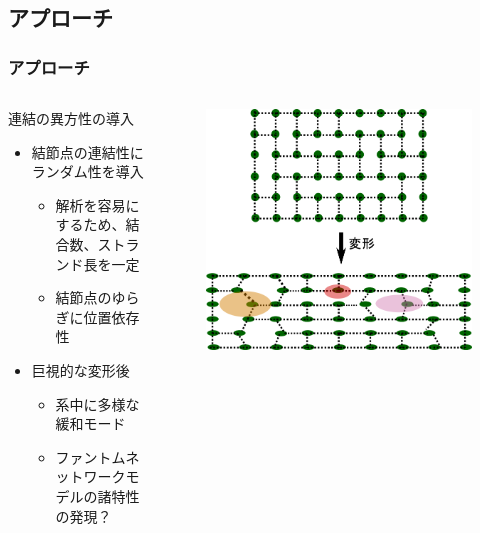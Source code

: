 \documentclass[11pt, dvipdfmx]{beamer}
\begin{document}
\subsection{アプローチ}
\begin{frame}
\frametitle{アプローチ}

\begin{columns}[totalwidth=1\textwidth]

\begin{block}{連結の異方性の導入}
\begin{itemize}
\item
結節点の連結性にランダム性を導入
\begin{itemize}
\item
解析を容易にするため、結合数、ストランド長を一定
\item
結節点のゆらぎに位置依存性
\end{itemize}
\item
巨視的な変形後
\begin{itemize}
\item
系中に多様な緩和モード
\item
ファントムネットワークモデルの諸特性の発現？
\end{itemize}
\end{itemize}
\end{block}

\begin{figure}
\centering
\includegraphics[width=\textwidth]{./fig/連結の異方性_2.png}
\end{figure}

\end{columns}

\end{frame}
\end{document}
